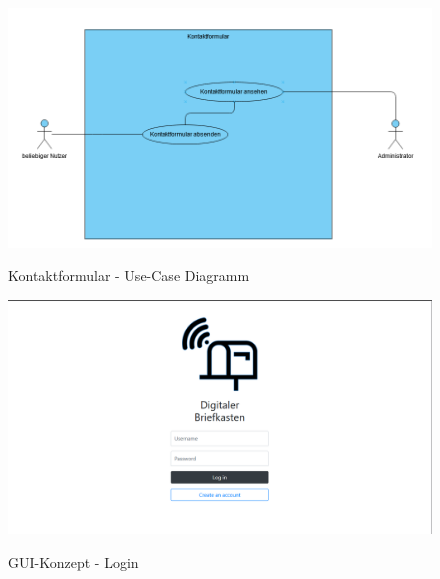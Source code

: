 \label{Anhang-Kontakt}
\begin{figure}[h]
    \centering
    \begin{minipage}[t]{1\textwidth}
        \caption{Kontaktformular - Use-Case Diagramm}
        \includegraphics[width=1\textwidth]{img/kontakt-use-case.png}\\
    \end{minipage}
\end{figure}

\clearpage
\pagebreak

\label{GUI-Konzept}

\begin{figure}[hbt]
    \centering
    \begin{minipage}[t]{1\textwidth}
        \caption{GUI-Konzept - Login}
        \includegraphics[width=1\textwidth]{img/login-konzept.png}\\
        \label{fig:login}
    \end{minipage}
\end{figure}

